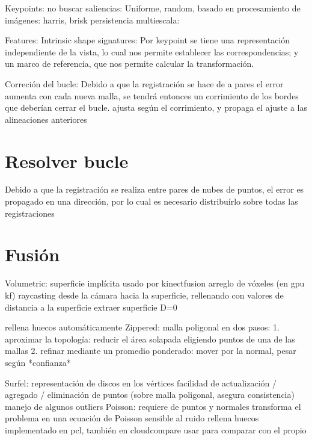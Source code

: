 \documentclass{pfc}
\begin{document}
		Keypoints:
			no buscar saliencias: Uniforme, random,
			basado en procesamiento de imágenes: harris, brisk
			persistencia multiescala:

		Features:
			Intrinsic shape signatures:
				Por keypoint se tiene
				una representación independiente de la vista,
					lo cual nos permite establecer las correspondencias;
				y un marco de referencia, que nos permite calcular la transformación.

		Correción del bucle:
			Debido a que la registración se hace de a pares el error aumenta
			con cada nueva malla, se tendrá entonces un corrimiento de los
			bordes que deberían cerrar el bucle.
				ajusta según el corrimiento, y propaga el ajuste a las alineaciones anteriores

	\section{Resolver bucle}
		Debido a que la registración se realiza entre pares de nubes de puntos,
		el error es propagado en una dirección, por lo cual es necesario distribuírlo sobre todas las registraciones

	\section{Fusión}
		Volumetric: superficie implícita%
			usado por kinectfusion
			arreglo de vóxeles (en gpu kf)
			raycasting desde la cámara hacia la superficie,
				rellenando con valores de distancia a la superficie
			extraer superficie D=0

			rellena huecos automáticamente
		Zippered: %
			malla poligonal
			en dos pasos:
				1. aproximar la topología: reducir el área solapada eligiendo puntos de una de las mallas
				2. refinar mediante un promedio ponderado: mover por la normal, pesar según *confianza*

		Surfel: %
			representación de discos en los vértices
			facilidad de actualización / agregado / eliminación de puntos (sobre malla poligonal, asegura consistencia)
			manejo de algunos outliers
		Poisson: %
			requiere de puntos y normales
			transforma el problema en una ecuación de Poisson %
			sensible al ruido
			rellena huecos
			implementado en pcl, también en cloudcompare
			usar para comparar con el propio
\end{document}
